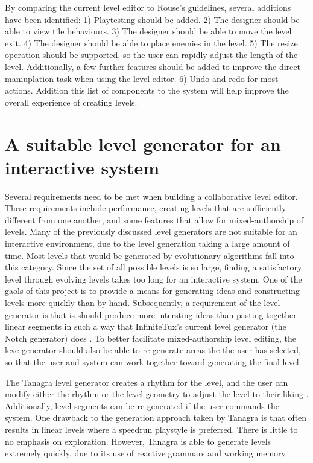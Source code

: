 By comparing the current level editor to Rouse's guidelines, several additions have been
identified: 1) Playtesting should be added. 2) The designer should be able to view tile 
behaviours. 3) The designer should be able to move the level exit. 4) The designer should
be able to place enemies in the level. 5) The resize operation should be supported, so the
user can rapidly adjust the length of the level. Additionally, a few further features should
be added to improve the direct maniuplation task when using the level editor. 6) Undo and
redo for most actions. Addition this list of components to the system will help improve
the overall experience of creating levels.

\section{A suitable level generator for an interactive system}

Several requirements need to be met when building a collaborative level editor. These
requirements include performance, creating levels that are sufficiently different from one
another, and some features that allow for mixed-authorship of levels. Many of the previously
discussed level generators are not suitable for an interactive environment, due to the 
level generation taking a large amount of time. Most levels that would be generated by
evolutionary algorithms fall into this category. Since the set of all possible levels is so
large, finding a satisfactory level through evolving levels takes too long for an
interactive system. One of the gaols of this project is to provide a means for generating
ideas and constructing levels more quickly than by hand. Subsequently, a requirement of the
level generator is that is should produce more intersting ideas than pasting together linear
segments in such a way that InfiniteTux's current level generator (the Notch generator) does
\cite{shaker2016}. To better facilitate mixed-authorship level editing, the leve generator
should also be able to re-generate areas the the user has selected, so that the user and
system can work together toward generating the final level.

The Tanagra level generator creates a rhythm for the level, and the user can modify either
the rhythm or the level geometry to adjust the level to their liking \cite{smith2010}.
Additionally, level segments can be re-generated if the user commands the system. One
drawback to the generation approach taken by Tanagra is that often results in linear levels
where a speedrun playstyle is preferred. There is little to no emphasis on exploration.
However, Tanagra is able to generate levels extremely quickly, due to its use of reactive
grammars and working memory.

